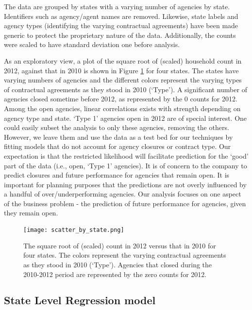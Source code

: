 \documentclass[ba]{imsart}
\newcommand{\response}[1]{{\color{blue}#1}}
\begin{document}
The data are grouped by states with a varying number of agencies by state. Identifiers such as agency/agent names are removed. Likewise, state labels and agency types (identifying the varying contractual agreements) have been made generic to protect the proprietary nature of the data. Additionally, the counts were scaled to have standard deviation one before analysis. 

As an exploratory view, a plot of the square root of (scaled) household count in 2012, against that in 2010 
is shown in Figure \ref{fig:ctVct} for four states. The states have varying numbers of agencies and  the different colors represent the varying types of contractual agreements as they stood in 2010 (`Type').  A significant number of agencies closed sometime before 2012, as represented by the $0$ counts for 2012. Among the open agencies, linear correlations exists with strength depending on agency type and state.  `Type 1' agencies open in 2012 are of special interest.  One could easily subset the analysis to only these agencies, removing the others. However,  we leave them and use the data as a test bed for our techniques by fitting models that do not account for agency closures or contract type.  Our expectation is that the restricted likelihood will facilitate prediction for the `good' part of the data (i.e., open, `Type 1' agencies).  \response{It is of concern to the company to predict closures and future performance for agencies that remain open. It is important for planning purposes that the predictions are not overly influenced by a handful of over/underperforming agencies. Our analysis focuses on one aspect of the business problem - the prediction of future performance for agencies, given they remain open.}  

\begin{figure}[t]
\centering
\texttt{[image: scatter\_by\_state.png]}
\caption{The square root of (scaled) count in 2012 versus that in 2010 for four states. The colors represent the varying contractual agreements as they stood in 2010 (`Type').  Agencies that closed during the 2010-2012 period are represented by the zero counts for 2012.}
\label{fig:ctVct}
\end{figure}

\subsection{State Level Regression model}
\end{document}
